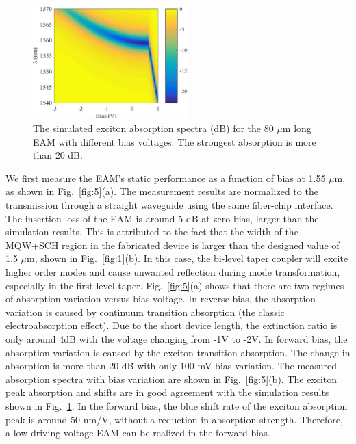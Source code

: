 \documentclass[aip,apl,preprint,a4paper]{revtex4-1}
\begin{document}
\begin{figure}
	\includegraphics[width=6cm]{figure/fig4.eps}%
	\caption{\label{fig:4} The simulated exciton absorption spectra (dB) for the 80 $\mu$m long EAM with different bias voltages. The strongest absorption is more than 20 dB.}
\end{figure}


We first measure the EAM’s static performance as a function of bias at 1.55 $\mu$m, as shown in Fig.~\ref{fig:5}(a). The measurement results are normalized to the transmission through a straight waveguide using the same fiber-chip interface. The insertion loss of the EAM is around 5 dB at zero bias, larger than the simulation results. This is attributed to the fact that the width of the MQW+SCH region in the fabricated device is larger than the designed value of 1.5 $\mu$m, shown in Fig.~\ref{fig:1}(b). In this case, the bi-level taper coupler will excite higher order modes and cause unwanted reflection during mode transformation, especially in the first level taper.\cite{huang2015ultracompact} Fig.~\ref{fig:5}(a) shows that there are two regimes of absorption variation versus bias voltage. In reverse bias, the absorption variation is caused by continuum transition absorption (the classic electroabsorption effect). Due to the short device length, the extinction ratio is only around 4dB with the voltage changing from -1V to -2V. In forward bias, the absorption variation is caused by the exciton transition absorption. The change in absorption is more than 20 dB with only 100 mV bias variation. The measured absorption spectra with bias variation are shown in Fig.~\ref{fig:5}(b). The exciton peak absorption and shifts are in good agreement with the simulation results shown in Fig.~\ref{fig:4}. In the forward bias, the blue shift rate of the exciton absorption peak is around 50 nm/V, without a reduction in absorption strength. Therefore, a low driving voltage EAM can be realized in the forward bias.
\end{document}
